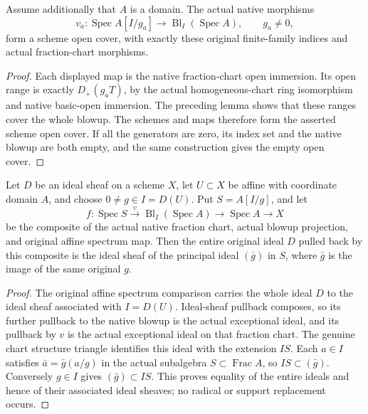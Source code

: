 \begin{theorem}
\label{thm:resume-specified-generator-fraction-cover}
\leanok
Assume additionally that $A$ is a domain. The actual native morphisms
\[
 v_a:\operatorname{Spec}A[I/g_a]\longrightarrow
          \operatorname{Bl}_I(\operatorname{Spec}A),\qquad g_a\ne0,
\]
form a scheme open cover, with exactly these original finite-family indices
and actual fraction-chart morphisms.
\end{theorem}
\begin{proof}
Each displayed map is the native fraction-chart open immersion. Its open range
is exactly $D_+(g_aT)$, by the actual homogeneous-chart ring isomorphism and
native basic-open immersion. The preceding lemma shows that these ranges cover
the whole blowup. The schemes and maps therefore form the asserted scheme open
cover. If all the generators are zero, its index set and the native blowup are
both empty, and the same construction gives the empty open cover.
\end{proof}

\begin{lemma}
\label{lem:resume-original-fraction-chart-comap}
\leanok
Let $D$ be an ideal sheaf on a scheme $X$, let $U\subset X$ be affine with
coordinate domain $A$, and choose $0\ne g\in I=D(U)$.
Put $S=A[I/g]$, and let
\[
 f:\operatorname{Spec}S\xrightarrow{v}
      \operatorname{Bl}_I(\operatorname{Spec}A)
      \longrightarrow\operatorname{Spec}A\longrightarrow X
\]
be the composite of the actual native fraction chart, actual blowup projection,
and original affine spectrum map. Then the entire original ideal $D$ pulled
back by this composite is the ideal sheaf of the principal ideal $(\bar g)$
in $S$, where $\bar g$ is the image of the same original $g$.
\end{lemma}
\begin{proof}
The original affine spectrum comparison carries the whole ideal $D$ to the
ideal sheaf associated with $I=D(U)$. Ideal-sheaf pullback composes, so its
further pullback to the native blowup is the actual exceptional ideal, and its
pullback by $v$ is the actual exceptional ideal on that fraction chart.
The genuine chart structure triangle identifies this ideal with the extension
$IS$. Each $a\in I$ satisfies $\bar a=\bar g(a/g)$ in the actual subalgebra
$S\subset\operatorname{Frac}A$, so $IS\subset(\bar g)$. Conversely $g\in I$
gives $(\bar g)\subset IS$. This proves equality of the entire ideals and hence
of their associated ideal sheaves; no radical or support replacement occurs.
\end{proof}

